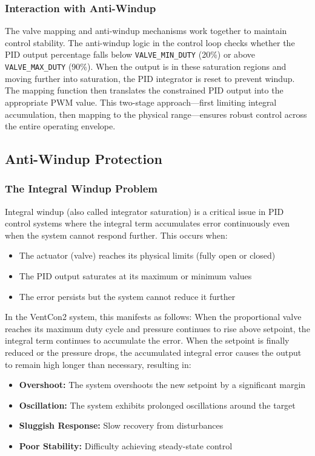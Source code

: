 \subsubsection{Interaction with Anti-Windup}
The valve mapping and anti-windup mechanisms work together to maintain control stability. The anti-windup logic in the control loop checks whether the PID output percentage falls below \texttt{VALVE\_MIN\_DUTY} (20\%) or above \texttt{VALVE\_MAX\_DUTY} (90\%). When the output is in these saturation regions and moving further into saturation, the PID integrator is reset to prevent windup. The mapping function then translates the constrained PID output into the appropriate PWM value. This two-stage approach---first limiting integral accumulation, then mapping to the physical range---ensures robust control across the entire operating envelope.

\subsection{Anti-Windup Protection}
\label{sec:anti-windup}

\subsubsection{The Integral Windup Problem}
Integral windup (also called integrator saturation) is a critical issue in PID control systems where the integral term accumulates error continuously even when the system cannot respond further. This occurs when:

\begin{itemize}
    \item The actuator (valve) reaches its physical limits (fully open or closed)
    \item The PID output saturates at its maximum or minimum values
    \item The error persists but the system cannot reduce it further
\end{itemize}

In the VentCon2 system, this manifests as follows: When the proportional valve reaches its maximum duty cycle and pressure continues to rise above setpoint, the integral term continues to accumulate the error. When the setpoint is finally reduced or the pressure drops, the accumulated integral error causes the output to remain high longer than necessary, resulting in:

\begin{itemize}
    \item \textbf{Overshoot:} The system overshoots the new setpoint by a significant margin
    \item \textbf{Oscillation:} The system exhibits prolonged oscillations around the target
    \item \textbf{Sluggish Response:} Slow recovery from disturbances
    \item \textbf{Poor Stability:} Difficulty achieving steady-state control
\end{itemize}

